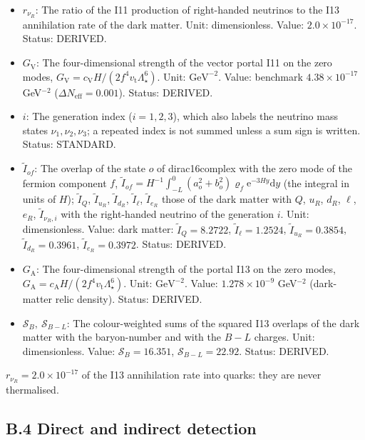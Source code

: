 \documentclass[
  10pt,
]{article}
\providecommand{\tightlist}{%
  \setlength{\itemsep}{0pt}\setlength{\parskip}{0pt}}
\begin{document}
\begin{itemize}
\tightlist
\item
  \(r_{\nu_R}\): The ratio of the I11 production of right-handed
  neutrinos to the I13 annihilation rate of the dark matter. Unit:
  dimensionless. Value: \(2.0\times10^{-17}\). Status: DERIVED.
\item
  \(G_{\mathrm{V}}\): The four-dimensional strength of the vector portal
  I11 on the zero modes,
  \(G_{\mathrm{V}} = c_{\mathrm{V}}H/(2f^4v_{\mathrm{t}}\Lambda_\star^6)\).
  Unit: \(\mathrm{GeV}^{-2}\). Value: benchmark \(4.38\times10^{-17}\)
  GeV\(^{-2}\) (\(\Delta N_{\mathrm{eff}} = 0.001\)). Status: DERIVED.
\item
  \(i\): The generation index (\(i = 1, 2, 3\)), which also labels the
  neutrino mass states \(\nu_1, \nu_2, \nu_3\); a repeated index is not
  summed unless a sum sign is written. Status: STANDARD.
\item
  \(\tilde I_{of}\): The overlap of the state \(o\) of dirac16complex
  with the zero mode of the fermion component \(f\),
  \(\tilde I_{of} = H^{-1}\int_{-L}^{0}(a_o^2 + b_o^2)\varrho_f\mathrm{e}^{-3Hy}\mathrm{d}y\)
  (the integral in units of \(H\)); \(\tilde I_Q\), \(\tilde I_{u_R}\),
  \(\tilde I_{d_R}\), \(\tilde I_\ell\), \(\tilde I_{e_R}\) those of the
  dark matter with \(Q\), \(u_R\), \(d_R\), \(\ell\), \(e_R\),
  \(\tilde I_{\nu_R,i}\) with the right-handed neutrino of the
  generation \(i\). Unit: dimensionless. Value: dark matter:
  \(\tilde I_Q = 8.2722\), \(\tilde I_\ell = 1.2524\),
  \(\tilde I_{u_R} = 0.3854\), \(\tilde I_{d_R} = 0.3961\),
  \(\tilde I_{e_R} = 0.3972\). Status: DERIVED.
\item
  \(G_{\mathrm{A}}\): The four-dimensional strength of the portal I13 on
  the zero modes,
  \(G_{\mathrm{A}} = c_{\mathrm{A}}H/(2f^4v_{\mathrm{t}}\Lambda_\star^6)\).
  Unit: \(\mathrm{GeV}^{-2}\). Value: \(1.278\times10^{-9}\)
  GeV\(^{-2}\) (dark-matter relic density). Status: DERIVED.
\item
  \(\mathcal{S}_B,\ \mathcal{S}_{B-L}\): The colour-weighted sums of the
  squared I13 overlaps of the dark matter with the baryon-number and
  with the \(B - L\) charges. Unit: dimensionless. Value:
  \(\mathcal{S}_B = 16.351\), \(\mathcal{S}_{B-L} = 22.92\). Status:
  DERIVED.
\end{itemize}

\(r_{\nu_R} = 2.0\times10^{-17}\) of the I13 annihilation rate into
quarks: they are never thermalised.

\hypertarget{b.4-direct-and-indirect-detection}{%
\subsection*{B.4 Direct and indirect
detection}\label{b.4-direct-and-indirect-detection}}
\end{document}
